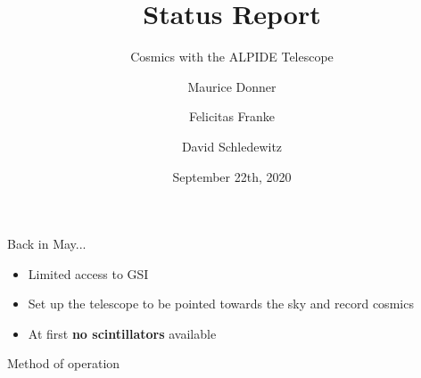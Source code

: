 \documentclass{beamer}
\title{\texorpdfstring{\color{blue!50!black}\textbf{Status Report}}{}}
\subtitle{Cosmics with the ALPIDE Telescope}
\author[Maurice \and Felicitas \and David]{Maurice Donner \and Felicitas Franke \and David Schledewitz}
\date{September 22th, 2020}
\begin{document}
\maketitle
\newpage

\begin{frame}{Back in May...}
    \begin{itemize}
	\item Limited access to GSI
	\item Set up the telescope to be pointed towards the sky and record
	    cosmics
	\item At first \textbf{no scintillators} available \\[1cm]
    \end{itemize}

\LARGE Method of operation \footnotesize \\[.5cm]


\end{frame}
\end{document}
